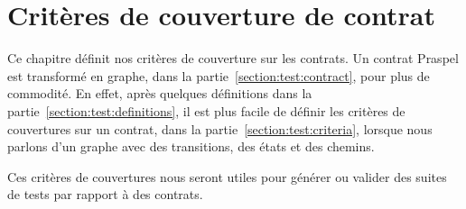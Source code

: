 \chapter{Critères de couverture de contrat}
\label{chapter:tests}

\minitoc

Ce chapitre définit nos critères de couverture sur les contrats. Un contrat
Praspel est transformé en graphe, dans la partie~\ref{section:test:contract},
pour plus de commodité. En effet, après quelques définitions dans la
partie~\ref{section:test:definitions}, il est plus facile de définir les
critères de couvertures sur un contrat, dans la
partie~\ref{section:test:criteria}, lorsque nous parlons d'un graphe avec des
transitions, des états et des chemins.

Ces critères de couvertures nous seront utiles pour générer ou valider des
suites de tests par rapport à des contrats.

